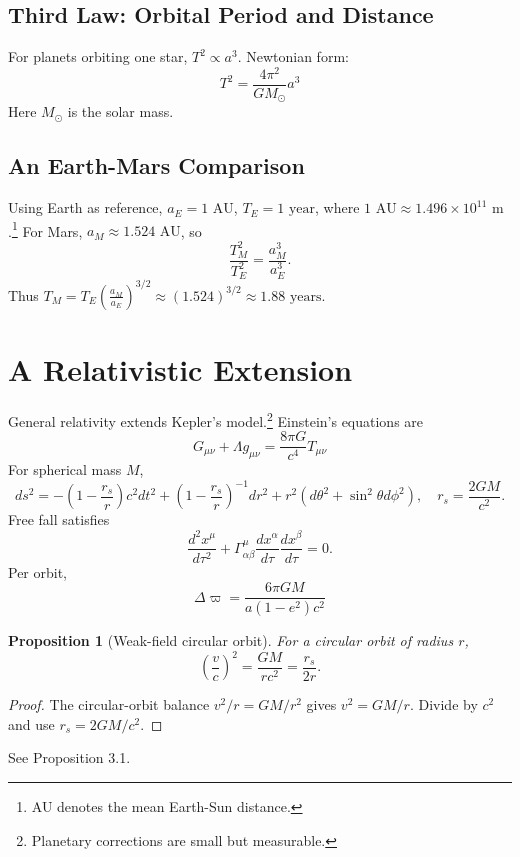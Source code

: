 \documentclass[11pt,a4paper]{article}
\newtheorem{proposition}{Proposition}[section]
\begin{document}
\subsection{Third Law: Orbital Period and Distance}
For planets orbiting one star, $T^{2}\propto a^{3}$. Newtonian form:
\begin{equation}
T^{2}=\frac{4\pi^{2}}{GM_{\odot}}a^{3}
\end{equation}
Here $M_{\odot}$ is the solar mass.

\subsection{An Earth-Mars Comparison}
Using Earth as reference, $a_{E}=1\text{ AU}$, $T_{E}=1\text{ year}$, where $1\text{ AU}\approx1.496\times10^{11}\text{ m}$.\footnote{AU denotes the mean Earth-Sun distance.} For Mars, $a_{M}\approx1.524\text{ AU}$, so
\begin{equation}
\frac{T_{M}^{2}}{T_{E}^{2}}=\frac{a_{M}^{3}}{a_{E}^{3}}.
\end{equation}
Thus $T_{M}=T_{E}\left(\frac{a_{M}}{a_{E}}\right)^{3/2} \approx (1.524)^{3/2} \approx 1.88\text{ years}$.

\section{A Relativistic Extension}
General relativity extends Kepler's model.\footnote{Planetary corrections are small but measurable.} Einstein's equations are
\begin{equation}
G_{\mu\nu}+\Lambda g_{\mu\nu}=\frac{8\pi G}{c^{4}}T_{\mu\nu}
\end{equation}
For spherical mass $M$,
\begin{equation}
ds^{2}=-\left(1-\frac{r_{s}}{r}\right)c^{2}dt^{2}+\left(1-\frac{r_{s}}{r}\right)^{-1}dr^{2}+r^{2}(d\theta^{2}+\sin^{2}\theta d\phi^{2}), \quad r_{s}=\frac{2GM}{c^{2}}.
\end{equation}
Free fall satisfies
\begin{equation}
\frac{d^{2}x^{\mu}}{d\tau^{2}}+\Gamma_{\alpha\beta}^{\mu}\frac{dx^{\alpha}}{d\tau}\frac{dx^{\beta}}{d\tau}=0.
\end{equation}
Per orbit,
\begin{equation}
\Delta\varpi=\frac{6\pi GM}{a(1-e^{2})c^{2}}
\end{equation}

\begin{proposition}[Weak-field circular orbit]
For a circular orbit of radius $r$,
\begin{equation}
\left(\frac{v}{c}\right)^{2}=\frac{GM}{rc^{2}}=\frac{r_{s}}{2r}.
\end{equation}
\end{proposition}
\begin{proof}
The circular-orbit balance $v^{2}/r=GM/r^{2}$ gives $v^{2}=GM/r$. Divide by $c^{2}$ and use $r_{s}=2GM/c^{2}$.
\end{proof}
See Proposition 3.1.
\end{document}
